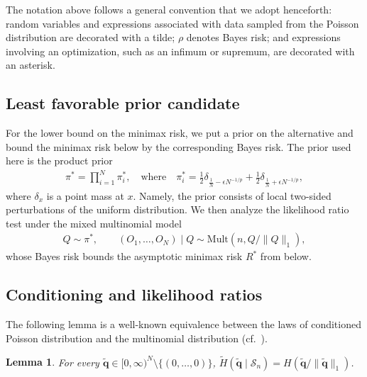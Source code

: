 \documentclass[11pt]{article}
\newtheorem{lem}[thm]{Lemma}
\numberwithin{equation}{section}
\newcommand{\Multi}{\mathrm{Mult}}
\newcommand{\Scal}{\mathcal{S}}
\begin{document}
The notation above follows a general convention that we adopt henceforth: random variables and expressions associated with data sampled from the Poisson distribution are decorated with a tilde; $\rho$ denotes Bayes risk; and expressions involving an optimization, such as an infimum or supremum, are decorated with an asterisk.

\subsection{Least favorable prior candidate}
For the lower bound on the minimax risk, we put a prior on the alternative and bound the minimax risk below by the corresponding Bayes risk. The prior used here is the product prior
\begin{align}
    \label{eq:least_favorable_prior}
    \pi^* = \prod_{i=1}^N \pi_i^*, \quad \text{where} \quad \pi_i^* = \frac{1}{2}\delta_{\frac{1}{N} - \epsilon N^{-1/p}} + \frac{1}{2}\delta_{\frac{1}{N} + \epsilon N^{-1/p}},
\end{align}
where $\delta_x$ is a point mass at $x$. Namely, the prior consists of local two-sided perturbations of the uniform distribution. We then analyze the likelihood ratio test under the mixed multinomial model
\begin{align}
\label{eq:mixed_multinomial_model}
Q \sim \pi^*,\qquad 
(O_1,\ldots,O_N) \mid Q \sim \Multi(n,Q/\|Q\|_1),
\end{align}
whose Bayes risk bounds the asymptotic minimax risk $R^*$ from below.

\subsection{Conditioning and likelihood ratios}

The following lemma is a well-known equivalence between the laws of conditioned Poisson distribution and the multinomial distribution (cf.\ \cite{aldous2013probability,barbour1992poisson}).
\begin{lem}
\label{lem:dist_equivalence}
    For every $\tilde{\mathbf{q}} \in [0,\infty)^N \setminus \{(0,\ldots,0)\}$, $\tilde{H}(\tilde{\mathbf{q}} \mid \Scal_n) = H(\tilde{\mathbf{q}}/\|\tilde{\mathbf{q}}\|_1)$.
\end{lem}
\end{document}
